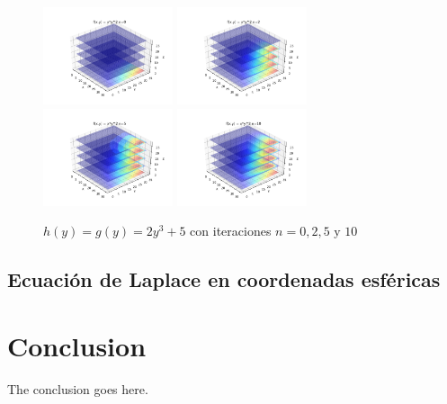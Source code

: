 \documentclass[10pt,journal,compsoc]{IEEEtran}
\begin{document}
\begin{figure}
  \centering
  \includegraphics[width=1.5in]{images/xy2-n0}
  \includegraphics[width=1.5in]{images/xy2-n2}
  \includegraphics[width=1.5in]{images/xy2-n5}
  \includegraphics[width=1.5in]{images/xy2-n10}
  \caption{\(h(y) = g(y) = 2y^3+5\) con iteraciones \(n = 0, 2, 5 \text{ y } 10\)}
  \label{xy2-iterations}
\end{figure}


\subsection{Ecuación de Laplace en coordenadas esféricas}



\section{Conclusion}
The conclusion goes here.





\end{document}
